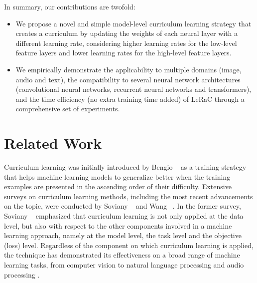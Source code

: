 \documentclass[10pt,twocolumn,letterpaper]{article}
\begin{document}
In summary, our contributions are twofold:
\begin{itemize}
    \item \vspace{-0.25cm} We propose a novel and simple model-level curriculum learning strategy that creates a curriculum by updating the weights of each neural layer with a different learning rate, considering higher learning rates for the low-level feature layers and lower learning rates for the high-level feature layers.
    \item \vspace{-0.25cm} We empirically demonstrate the applicability to multiple domains (image, audio and text), the compatibility to several neural network architectures (convolutional neural networks, recurrent neural networks and transformers), and the time efficiency (no extra training time added) of LeRaC through a comprehensive set of experiments.
\end{itemize}

\vspace{-0.2cm}
\section{Related Work}
\vspace{-0.1cm}

Curriculum learning was initially introduced by Bengio \etal~\cite{Bengio-ICML-2009} as a training strategy that helps machine learning models to generalize better when the training examples are presented in the ascending order of their difficulty. Extensive surveys on curriculum learning methods, including the most recent advancements on the topic, were conducted by Soviany \etal~\cite{Soviany-IJCV-2022} and Wang \etal~\cite{Wang-PAMI-2021}. In the former survey, Soviany \etal~\cite{Soviany-IJCV-2022} emphasized that curriculum learning is not only applied at the data level, but also with respect to the other components involved in a machine learning approach, namely at the model level, the task level and the objective (loss) level. Regardless of the component on which curriculum learning is applied, the technique has demonstrated its effectiveness on a broad range of machine learning tasks, from computer vision \cite{Bengio-ICML-2009, Gui-FG-2017, Jiang-ICML-2018, Shi-ECCV-2016, Soviany-CVIU-2021, Chen-ICCV-2015, Sinha-NIPS-2020} to natural language processing \cite{Platanios-NAACL-2019, Kocmi-RANLP-2017, Spitkovsky-NIPS-2009, Liu-IJCAI-2018,Bengio-ICML-2009} and audio processing \cite{Ranjan-ACM-2018, Amodei-ICML-2016}.
\end{document}
